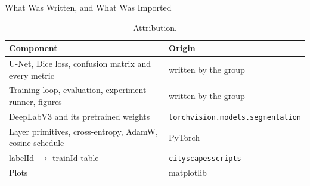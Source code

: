 \begin{frame}{What Was Written, and What Was Imported}
\small
\begin{table}
\centering
\caption{Attribution.}
\begin{tabular}{ll}
\toprule
\textbf{Component} & \textbf{Origin} \\
\midrule
U-Net, Dice loss, confusion matrix and every metric & written by the group \\
Training loop, evaluation, experiment runner, figures & written by the group \\
DeepLabV3 and its pretrained weights & \texttt{torchvision.models.segmentation} \\
Layer primitives, cross-entropy, AdamW, cosine schedule & PyTorch~\cite{paszke2019pytorch} \\
labelId $\rightarrow$ trainId table & \texttt{cityscapesscripts} \\
Plots & matplotlib \\
\bottomrule
\end{tabular}
\end{table}
\end{frame}
